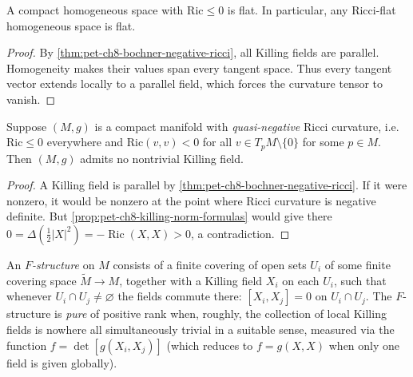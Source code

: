 \begin{corollary}
  \label{cor:pet-ch8-homogeneous-negative-ricci-flat}

  A compact homogeneous space with $\mathrm{Ric}\le0$ is flat. In particular,
  any Ricci-flat homogeneous space is flat.
\end{corollary}
\begin{proof}
  \sketch
  By \cref{thm:pet-ch8-bochner-negative-ricci}, all Killing fields are
  parallel. Homogeneity makes their values span every tangent space. Thus
  every tangent vector extends locally to a parallel field, which forces the
  curvature tensor to vanish.
\end{proof}

\begin{theorem}
  \label{thm:pet-ch8-quasi-negative-ricci-no-killing}

  Suppose $(M,g)$ is a compact manifold with \emph{quasi-negative} Ricci
  curvature, i.e.\ $\mathrm{Ric}\le0$ everywhere and $\mathrm{Ric}(v,v)<0$ for
  all $v\in T_pM\setminus\{0\}$ for some $p\in M$. Then $(M,g)$ admits no
  nontrivial Killing field.
\end{theorem}
\begin{proof}
  \sketch
  A Killing field is parallel by
  \cref{thm:pet-ch8-bochner-negative-ricci}. If it were nonzero, it would be
  nonzero at the point where Ricci curvature is negative definite. But
  \cref{prop:pet-ch8-killing-norm-formulas} would give there
  \(0=\Delta(\tfrac12|X|^2)=-\operatorname{Ric}(X,X)>0\), a contradiction.
\end{proof}

\begin{definition}[$F$-structure]
  \label{def:pet-ch8-f-structure}

  An \emph{$F$-structure} on $M$ consists of a finite covering of open sets
  $U_i$ of some finite covering space $\widetilde M\to M$, together with a
  Killing field $X_i$ on each $U_i$, such that whenever $U_i\cap U_j\ne\varnothing$
  the fields commute there: $[X_i,X_j]=0$ on $U_i\cap U_j$. The $F$-structure is
  \emph{pure} of positive rank when, roughly, the collection of local Killing
  fields is nowhere all simultaneously trivial in a suitable sense, measured via
  the function $f=\det[g(X_i,X_j)]$ (which reduces to $f=g(X,X)$ when only one
  field is given globally).
\end{definition}

